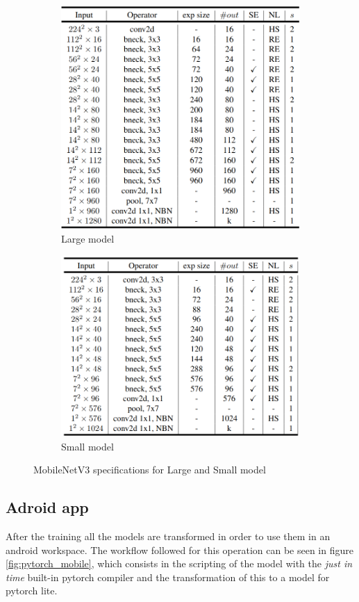 \documentclass[12pt, letterpaper, twoside]{article}
\begin{document}
\begin{figure}[h]
	\centering
	\begin{subfigure}{.5\textwidth}
		\centering
		\includegraphics[width=.9\linewidth]{spec_large.png}
		\caption{Large model}
	\end{subfigure}%
	\begin{subfigure}{.5\textwidth}
		\centering
		\includegraphics[width=.9\linewidth]{spec_small.png}
		\caption{Small model}
	\end{subfigure}
	\caption{MobileNetV3 specifications for Large and Small model}
	\label{fig:specifications}
\end{figure}

\subsection{Adroid app}
After the training all the models are transformed in order to use them in an android workspace. The workflow followed for this operation can be seen in figure \ref{fig:pytorch_mobile}, which consists in the scripting of the model with the \textit{just in time} built-in pytorch compiler and the transformation of this to a model for pytorch lite.
\end{document}
